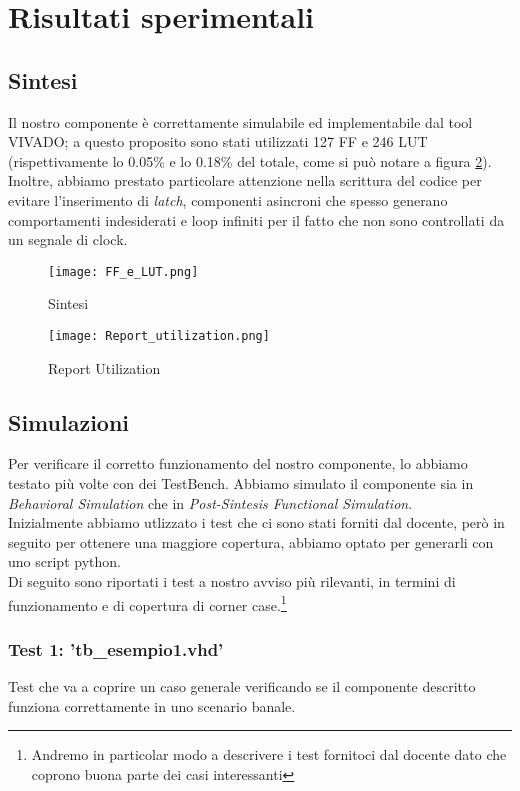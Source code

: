 \documentclass[a4paper]{article}
\begin{document}
\section{Risultati sperimentali}
\subsection{Sintesi}
Il nostro componente è correttamente simulabile ed implementabile dal tool VIVADO; a questo proposito sono stati utilizzati 127 FF e 246 LUT (rispettivamente lo 0.05\% e lo 0.18\% del totale, come si può notare a figura \ref{fig:report}). Inoltre, abbiamo prestato particolare attenzione nella scrittura del codice per evitare l'inserimento di \textit{latch}, componenti asincroni che spesso generano comportamenti indesiderati e loop infiniti per il fatto che non sono controllati da un segnale di clock.
\begin{figure}[htp]
    \centering
    \texttt{[image: FF\_e\_LUT.png]}
    \caption{Sintesi}
    \label{fig:sintesi}
\end{figure}
\begin{figure}[htp]
    \centering
    \texttt{[image: Report\_utilization.png]}
    \caption{Report Utilization}
    \label{fig:report}
\end{figure}

\subsection{Simulazioni}
Per verificare il corretto funzionamento del nostro componente, lo abbiamo testato più volte con dei TestBench. Abbiamo simulato il componente sia in \textit{Behavioral Simulation} che in \textit{Post-Sintesis Functional Simulation}.\\ Inizialmente abbiamo utlizzato i test che ci sono stati forniti dal docente, però in seguito per ottenere una maggiore copertura, abbiamo optato per generarli con uno script python.\\
Di seguito sono riportati i test a nostro avviso più rilevanti, in termini di funzionamento e di copertura di corner case.\footnote{Andremo in particolar modo a descrivere i test fornitoci dal docente dato che coprono buona parte dei casi interessanti}
\subsubsection{Test 1: 'tb\_esempio1.vhd' }
Test che va a coprire un caso generale verificando se il componente descritto funziona correttamente in uno scenario banale.
\clearpage
\end{document}
